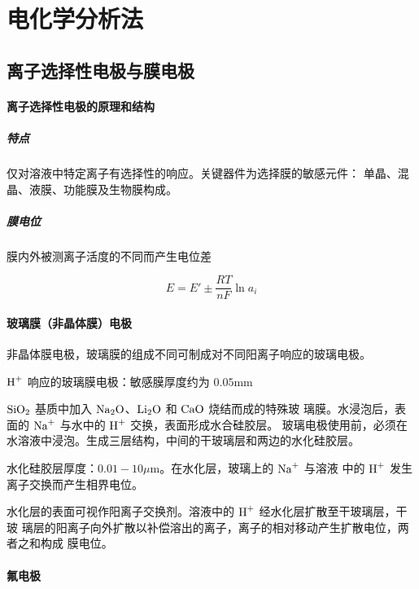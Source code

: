 \chapter{电化学分析法}

\section{离子选择性电极与膜电极}

\subsubsection{离子选择性电极的原理和结构}

\paragraph{特点} 仅对溶液中特定离子有选择性的响应。关键器件为选择膜的敏感元件：
单晶、混晶、液膜、功能膜及生物膜构成。

\paragraph{膜电位} 膜内外被测离子活度的不同而产生电位差

\begin{equation}
    E = E' \pm \frac{RT}{nF} \ln a_i
\end{equation}


\subsubsection{玻璃膜（非晶体膜）电极}

非晶体膜电极，玻璃膜的组成不同可制成对不同阳离子响应的玻璃电极。

$\ce{H+}$ 响应的玻璃膜电极：敏感膜厚度约为 $0.05 \mathrm{mm}$

$\ce{SiO2}$ 基质中加入 $\ce{Na2O}$、$\ce{Li2O}$ 和 $\ce{CaO}$ 烧结而成的特殊玻
璃膜。水浸泡后，表面的 $\ce{Na+}$ 与水中的 $\ce{H+}$ 交换，表面形成水合硅胶层。
玻璃电极使用前，必须在水溶液中浸泡。生成三层结构，中间的干玻璃层和两边的水化硅胶层。

水化硅胶层厚度：$0.01 - 10 \mu \mathrm m$。在水化层，玻璃上的 $\ce{Na+}$ 与溶液
中的 $\ce{H+}$ 发生离子交换而产生相界电位。

水化层的表面可视作阳离子交换剂。溶液中的 $\ce{H+}$ 经水化层扩散至干玻璃层，干玻
璃层的阳离子向外扩散以补偿溶出的离子，离子的相对移动产生扩散电位，两者之和构成
膜电位。


\subsubsection{氟电极}


